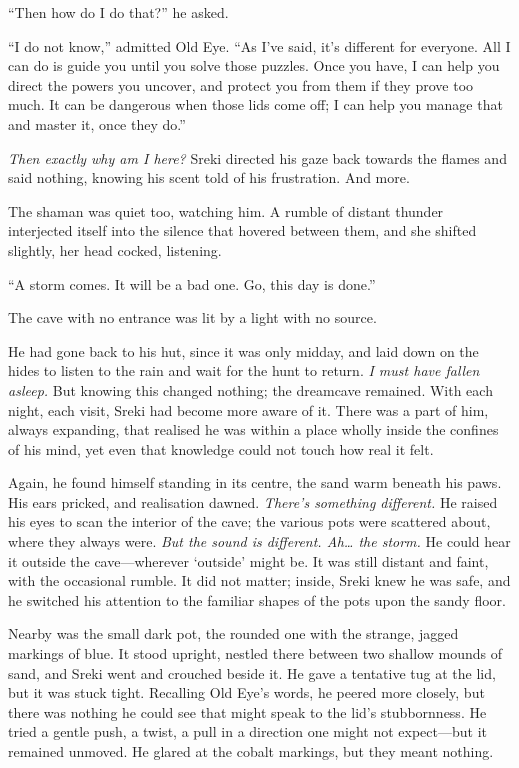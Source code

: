 ``Then how do I do that?'' he asked.

``I do not know,'' admitted Old Eye. ``As I've said, it's different for everyone. All I can do is guide you until you solve those puzzles. Once you have, I can help you direct the powers you uncover, and protect you from them if they prove too much. It can be dangerous when those lids come off; I can help you manage that and master it, once they do.''

\emph{Then exactly why am I here?} Sreki directed his gaze back towards the flames and said nothing, knowing his scent told of his frustration. And more.

The shaman was quiet too, watching him. A rumble of distant thunder interjected itself into the silence that hovered between them, and she shifted slightly, her head cocked, listening.

``A storm comes. It will be a bad one. Go, this day is done.''

\secdiv

\noindent The cave with no entrance was lit by a light with no source.

He had gone back to his hut, since it was only midday, and laid down on the hides to listen to the rain and wait for the hunt to return. \emph{I must have fallen asleep.} But knowing this changed nothing; the dreamcave remained. With each night, each visit, Sreki had become more aware of it. There was a part of him, always expanding, that realised he was within a place wholly inside the confines of his mind, yet even that knowledge could not touch how real it felt.

Again, he found himself standing in its centre, the sand warm beneath his paws. His ears pricked, and realisation dawned. \emph{There's something different.} He raised his eyes to scan the interior of the cave; the various pots were scattered about, where they always were. \emph{But the sound is different. Ah\ldots{} the storm.} He could hear it outside the cave---wherever `outside' might be. It was still distant and faint, with the occasional rumble. It did not matter; inside, Sreki knew he was safe, and he switched his attention to the familiar shapes of the pots upon the sandy floor.

Nearby was the small dark pot, the rounded one with the strange, jagged markings of blue. It stood upright, nestled there between two shallow mounds of sand, and Sreki went and crouched beside it. He gave a tentative tug at the lid, but it was stuck tight. Recalling Old Eye's words, he peered more closely, but there was nothing he could see that might speak to the lid's stubbornness. He tried a gentle push, a twist, a pull in a direction one might not expect---but it remained unmoved. He glared at the cobalt markings, but they meant nothing.

